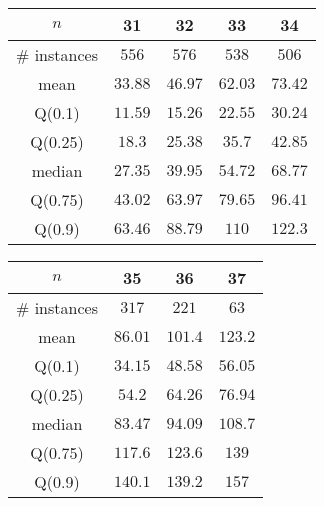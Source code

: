 \begin{tabular}{c|cccc} 
\hline 
$n$ & 31 & 32 & 33 & 34 \tabularnewline 
\hline 
\hline 
\# instances & $556$ & $576$ & $538$ & $506$ \tabularnewline 
mean & $33.88$ & $46.97$ & $62.03$ & $73.42$ \tabularnewline 
Q(0.1) & $11.59$ & $15.26$ & $22.55$ & $30.24$ \tabularnewline 
Q(0.25) & $18.3$ & $25.38$ & $35.7$ & $42.85$ \tabularnewline 
median & $27.35$ & $39.95$ & $54.72$ & $68.77$ \tabularnewline 
Q(0.75) & $43.02$ & $63.97$ & $79.65$ & $96.41$ \tabularnewline 
Q(0.9) & $63.46$ & $88.79$ & $110$ & $122.3$ \tabularnewline 
\hline 
\end{tabular} 
\medskip{} 

\begin{tabular}{c|ccc} 
\hline 
$n$ & 35 & 36 & 37 \tabularnewline 
\hline 
\hline 
\# instances & $317$ & $221$ & $63$ \tabularnewline 
mean & $86.01$ & $101.4$ & $123.2$ \tabularnewline 
Q(0.1) & $34.15$ & $48.58$ & $56.05$ \tabularnewline 
Q(0.25) & $54.2$ & $64.26$ & $76.94$ \tabularnewline 
median & $83.47$ & $94.09$ & $108.7$ \tabularnewline 
Q(0.75) & $117.6$ & $123.6$ & $139$ \tabularnewline 
Q(0.9) & $140.1$ & $139.2$ & $157$ \tabularnewline 
\hline 
\end{tabular} 
\medskip{} 

